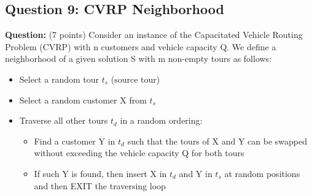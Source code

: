 \subsection{Question 9: CVRP Neighborhood}
\textbf{Question:} (7 points) Consider an instance of the Capacitated Vehicle Routing Problem (CVRP) with n customers and vehicle capacity Q. We define a neighborhood of a given solution S with m non-empty tours as follows:
\begin{itemize}
\item Select a random tour $t_s$ (source tour)
\item Select a random customer X from $t_s$
\item Traverse all other tours $t_d$ in a random ordering:
  \begin{itemize}
  \item Find a customer Y in $t_d$ such that the tours of X and Y can be swapped without exceeding the vehicle capacity Q for both tours
  \item If such Y is found, then insert X in $t_d$ and Y in $t_s$ at random positions and then EXIT the traversing loop
  \end{itemize}
\end{itemize}

